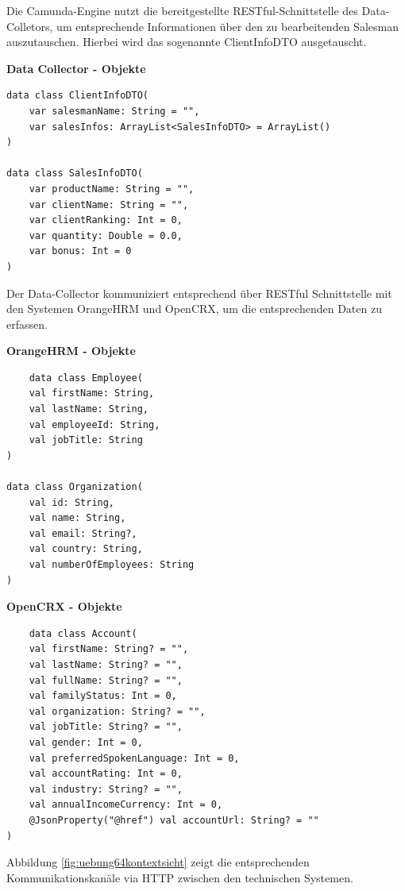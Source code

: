 \documentclass[]{article}
\begin{document}
Die Camunda-Engine nutzt die bereitgestellte RESTful-Schnittstelle des Data-Colletors, um entsprechende Informationen über den zu bearbeitenden Salesman auszutauschen.
Hierbei wird das sogenannte ClientInfoDTO ausgetauscht.

\textbf{Data Collector - Objekte}
\begin{verbatim}
data class ClientInfoDTO(
    var salesmanName: String = "",
    var salesInfos: ArrayList<SalesInfoDTO> = ArrayList()
)

data class SalesInfoDTO(
    var productName: String = "",
    var clientName: String = "",
    var clientRanking: Int = 0,
    var quantity: Double = 0.0,
    var bonus: Int = 0
)
\end{verbatim}

Der Data-Collector kommuniziert entsprechend über RESTful Schnittstelle mit den Systemen OrangeHRM und OpenCRX, um die entsprechenden Daten zu erfassen.

\textbf{OrangeHRM - Objekte}
\begin{verbatim}
	data class Employee(
    val firstName: String,
    val lastName: String,
    val employeeId: String,
    val jobTitle: String
)

data class Organization(
    val id: String,
    val name: String,
    val email: String?,
    val country: String,
    val numberOfEmployees: String
)
\end{verbatim}

\textbf{OpenCRX - Objekte}
\begin{verbatim}
	data class Account(
    val firstName: String? = "",
    val lastName: String? = "",
    val fullName: String? = "",
    val familyStatus: Int = 0,
    val organization: String? = "",
    val jobTitle: String? = "",
    val gender: Int = 0,
    val preferredSpokenLanguage: Int = 0,
    val accountRating: Int = 0,
    val industry: String? = "",
    val annualIncomeCurrency: Int = 0,
    @JsonProperty("@href") val accountUrl: String? = ""
)
\end{verbatim}

Abbildung \ref{fig:uebung64kontextsicht} zeigt die entsprechenden Kommunikationskanäle via HTTP zwischen den technischen Systemen.
\end{document}
